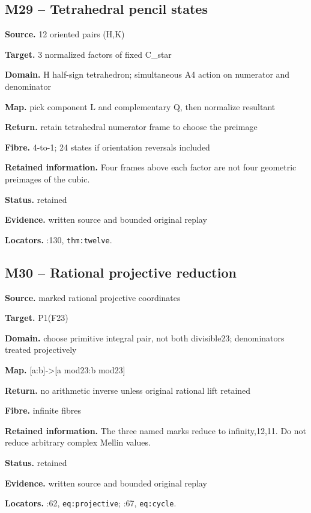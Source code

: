 \subsection*{M29 -- Tetrahedral pencil states}
\noindent\textbf{Source.} 12 oriented pairs (H,K)\par
\noindent\textbf{Target.} 3 normalized factors of fixed C\_star\par
\noindent\textbf{Domain.} H half-sign tetrahedron; simultaneous A4 action on numerator and denominator\par
\noindent\textbf{Map.} pick component L and complementary Q, then normalize resultant\par
\noindent\textbf{Return.} retain tetrahedral numerator frame to choose the preimage\par
\noindent\textbf{Fibre.} 4-to-1; 24 states if orientation reversals included\par
\noindent\textbf{Retained information.} Four frames above each factor are not four geometric preimages of the cubic.\par
\noindent\textbf{Status.} retained\par
\noindent\textbf{Evidence.} written source and bounded original replay\par
\noindent\textbf{Locators.} :130, \texttt{thm:twelve}.
\subsection*{M30 -- Rational projective reduction}
\noindent\textbf{Source.} marked rational projective coordinates\par
\noindent\textbf{Target.} P1(F23)\par
\noindent\textbf{Domain.} choose primitive integral pair, not both divisible23; denominators treated projectively\par
\noindent\textbf{Map.} [a:b]->[a mod23:b mod23]\par
\noindent\textbf{Return.} no arithmetic inverse unless original rational lift retained\par
\noindent\textbf{Fibre.} infinite fibres\par
\noindent\textbf{Retained information.} The three named marks reduce to infinity,12,11. Do not reduce arbitrary complex Mellin values.\par
\noindent\textbf{Status.} retained\par
\noindent\textbf{Evidence.} written source and bounded original replay\par
\noindent\textbf{Locators.} :62, \texttt{eq:projective}; :67, \texttt{eq:cycle}.
